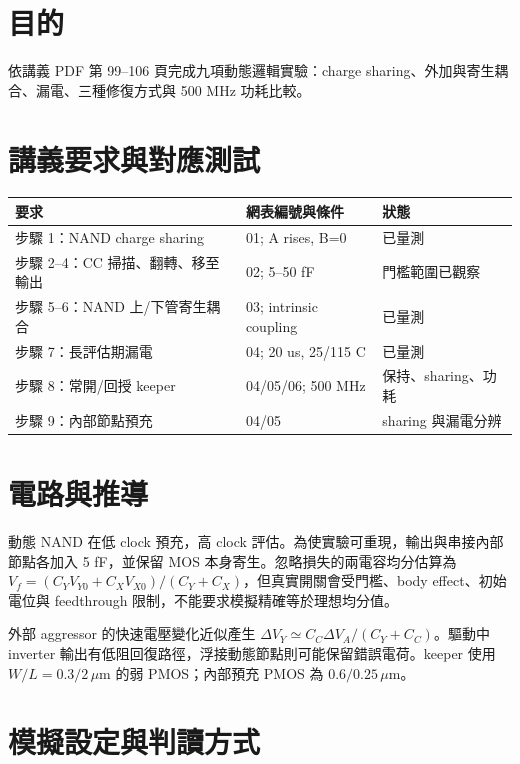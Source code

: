 \section{目的}

依講義 PDF 第 99--106 頁完成九項動態邏輯實驗：charge sharing、外加與寄生耦合、漏電、三種修復方式與 500 MHz 功耗比較。

\section{講義要求與對應測試}

\begin{center}
\small
\setlength{\tabcolsep}{4pt}
\begin{tabular}{p{.42\linewidth}p{.29\linewidth}p{.18\linewidth}}
\toprule
要求 & 網表編號與條件 & 狀態 \\
\midrule
步驟 1：NAND charge sharing & 01; A rises, B=0 & 已量測 \\
步驟 2--4：CC 掃描、翻轉、移至輸出 & 02; 5--50 fF & 門檻範圍已觀察 \\
步驟 5--6：NAND 上/下管寄生耦合 & 03; intrinsic coupling & 已量測 \\
步驟 7：長評估期漏電 & 04; 20 us, 25/115 C & 已量測 \\
步驟 8：常開/回授 keeper & 04/05/06; 500 MHz & 保持、sharing、功耗 \\
步驟 9：內部節點預充 & 04/05 & sharing 與漏電分辨 \\
\bottomrule
\end{tabular}
\end{center}

\section{電路與推導}

動態 NAND 在低 clock 預充，高 clock 評估。為使實驗可重現，輸出與串接內部節點各加入 5 fF，並保留 MOS 本身寄生。忽略損失的兩電容均分估算為 $V_f=(C_YV_{Y0}+C_XV_{X0})/(C_Y+C_X)$，但真實開關會受門檻、body effect、初始電位與 feedthrough 限制，不能要求模擬精確等於理想均分值。

外部 aggressor 的快速電壓變化近似產生 $\Delta V_Y\simeq C_C\Delta V_A/(C_Y+C_C)$。驅動中 inverter 輸出有低阻回復路徑，浮接動態節點則可能保留錯誤電荷。keeper 使用 $W/L=0.3/2\,\mu\mathrm m$ 的弱 PMOS；內部預充 PMOS 為 $0.6/0.25\,\mu\mathrm m$。

\section{模擬設定與判讀方式}

